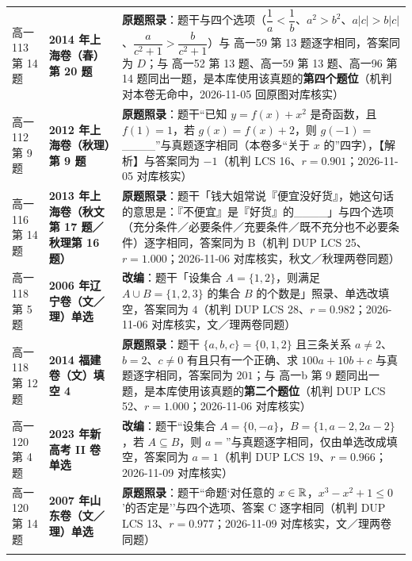 \documentclass[a4paper,11pt]{article}
\begin{document}
\begin{xltabular}{\textwidth}{@{}>{\raggedright\arraybackslash}p{2.85cm}>{\raggedright\arraybackslash}p{3.99cm}>{\raggedright\arraybackslash}p{7.89cm}@{}}
高一113 第 14 题 & \textbf{2014 年上海卷（春）第 20 题} & \textbf{原题照录}：题干与四个选项（\(\dfrac1a<\dfrac1b\)、\(a^2>b^2\)、\(a\lvert c\rvert>b\lvert c\rvert\)、\(\dfrac a{c^2+\allowbreak 1}>\dfrac b{c^2+\allowbreak 1}\)）与 高一59 第 13 题逐字相同，答案同为 \(D\)；与 高一52 第 13 题、高一59 第 13 题、高一96 第 14 题同出一题，是本库使用该真题的\textbf{第四个题位}（机判对本卷无命中，2026-11-05 回原图对库核实） \\ \addlinespace[1pt]
高一112 第 9 题 & \textbf{2012 年上海卷（秋理）第 9 题} & \textbf{原题照录}：题干``已知 \(y=f(x)+x^2\) 是奇函数，且 \(f(1)=\allowbreak 1\)，若 \(g(x)=f(x)+\allowbreak 2\)，则 \(g(-1)=\allowbreak \)\_\_\_\_''与真题逐字相同（本卷多``关于 \(x\) 的''四字），【解析】与答案同为 \(-1\)（机判 LCS 16、\(r=\allowbreak 0.901\)；2026-11-05 对库核实） \\ \addlinespace[1pt]
高一116 第 14 题 & \textbf{2013 年上海卷（秋文第 17 题／秋理第 16 题）} & \textbf{原题照录}：题干「钱大姐常说『便宜没好货』，她这句话的意思是：『不便宜』是『好货』的\_\_\_\_」与四个选项（充分条件／必要条件／充要条件／既不充分也不必要条件）逐字相同，答案同为 B（机判 DUP LCS 25、\(r=\allowbreak 1.000\)；2026-11-06 对库核实，秋文／秋理两卷同题） \\ \addlinespace[1pt]
高一118 第 5 题 & \textbf{2006 年辽宁卷（文／理）单选} & \textbf{改编}：题干「设集合 \(A=\allowbreak \{1,\allowbreak 2\}\)，则满足 \(A\cup\allowbreak  B=\allowbreak \{1,\allowbreak 2,\allowbreak 3\}\) 的集合 \(B\) 的个数是」照录、单选改填空，答案同为 \(4\)（机判 DUP LCS 28、\(r=\allowbreak 0.982\)；2026-11-06 对库核实，文／理两卷同题） \\ \addlinespace[1pt]
高一118 第 12 题 & \textbf{2014 福建卷（文）填空 4} & \textbf{原题照录}：题干 \(\{a,b,c\}=\allowbreak \{0,\allowbreak 1,\allowbreak 2\}\) 且三条关系 \(a\neq2\)、\(b=\allowbreak 2\)、\(c\neq0\) 有且只有一个正确、求 \(100a+\allowbreak 10b+c\) 与真题逐字相同，答案同为 \(201\)；与 高一b 第 9 题同出一题，是本库使用该真题的\textbf{第二个题位}（机判 DUP LCS 52、\(r=\allowbreak 1.000\)；2026-11-06 对库核实） \\ \addlinespace[1pt]
高一120 第 4 题 & \textbf{2023 年新高考 II 卷单选} & \textbf{改编}：题干``设集合 \(A=\allowbreak \{0,\allowbreak -a\}\)，\(B=\allowbreak \{1,a-2,\allowbreak 2a-2\}\)，若 \(A\subseteq\allowbreak  B\)，则 \(a=\allowbreak \)''与真题逐字相同，仅由单选改成填空，答案同为 \(a=\allowbreak 1\)（机判 DUP LCS 19、\(r=\allowbreak 0.966\)；2026-11-09 对库核实） \\ \addlinespace[1pt]
高一120 第 14 题 & \textbf{2007 年山东卷（文／理）单选} & \textbf{原题照录}：题干``命题`对任意的 \(x\in\mathbb{R}\)，\(x^3-x^2+\allowbreak 1\leqslant\allowbreak 0\)'的否定是''与四个选项、答案 C 逐字相同（机判 DUP LCS 13、\(r=\allowbreak 0.977\)；2026-11-09 对库核实，文／理两卷同题） \\ \addlinespace[1pt]

\end{xltabular}
\end{document}
